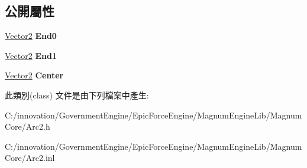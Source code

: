 \subsection*{公開屬性}
\begin{DoxyCompactItemize}
\item 
\hyperlink{class_i_dream_sky_1_1_vector2}{Vector2} {\bfseries End0}\hypertarget{class_i_dream_sky_1_1_arc2_a418c964fe0bc50cd20d4396685ab8dd7}{}\label{class_i_dream_sky_1_1_arc2_a418c964fe0bc50cd20d4396685ab8dd7}

\item 
\hyperlink{class_i_dream_sky_1_1_vector2}{Vector2} {\bfseries End1}\hypertarget{class_i_dream_sky_1_1_arc2_adb542e79fc3274008e5e41bb7646f4b9}{}\label{class_i_dream_sky_1_1_arc2_adb542e79fc3274008e5e41bb7646f4b9}

\item 
\hyperlink{class_i_dream_sky_1_1_vector2}{Vector2} {\bfseries Center}\hypertarget{class_i_dream_sky_1_1_arc2_a3d1420eef40de151462a0c5767bdf714}{}\label{class_i_dream_sky_1_1_arc2_a3d1420eef40de151462a0c5767bdf714}

\end{DoxyCompactItemize}


此類別(class) 文件是由下列檔案中產生\+:\begin{DoxyCompactItemize}
\item 
C\+:/innovation/\+Government\+Engine/\+Epic\+Force\+Engine/\+Magnum\+Engine\+Lib/\+Magnum\+Core/Arc2.\+h\item 
C\+:/innovation/\+Government\+Engine/\+Epic\+Force\+Engine/\+Magnum\+Engine\+Lib/\+Magnum\+Core/Arc2.\+inl\end{DoxyCompactItemize}
